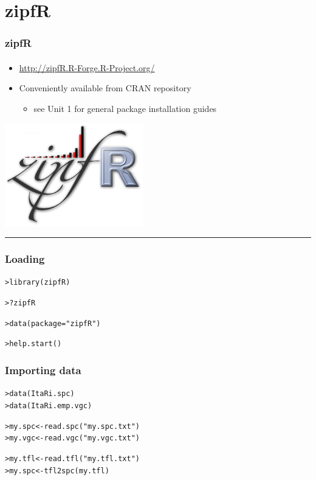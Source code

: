 \documentclass[t]{beamer} %
\begin{document}
\section{zipfR}

\begin{frame}
  \frametitle{zipfR}
  \framesubtitle{\citet{Evert:Baroni:07}}

  \begin{itemize}
  \item \url{http://zipfR.R-Forge.R-Project.org/}
  \item Conveniently available from CRAN repository
    \begin{itemize}
    \item see Unit 1 for general package installation guides
    \end{itemize}
  \end{itemize}

  \begin{flushright}
    \includegraphics[width=6cm]{img/zipfR_logo}
    \rule{1cm}{0mm}
  \end{flushright}

\end{frame}

\begin{frame}[fragile]
  \frametitle{Loading}

\begin{alltt}
> library(zipfR)

> ?zipfR

> data(package="zipfR")

> help.start() 
\end{alltt}

\end{frame}


\begin{frame}[fragile]
  \frametitle{Importing data}

\begin{alltt}
> data(ItaRi.spc)     
> data(ItaRi.emp.vgc)

> my.spc <- read.spc("my.spc.txt")
> my.vgc <- read.vgc("my.vgc.txt")

> my.tfl <- read.tfl("my.tfl.txt")
> my.spc <- tfl2spc(my.tfl) 
\end{alltt}

\end{frame}
\end{document}
